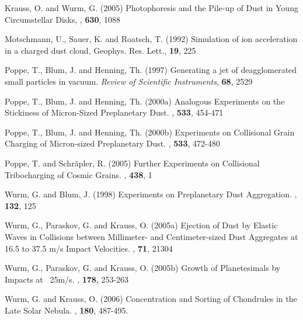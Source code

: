 \begin{ownpubl}
\item Krauss, O. and Wurm, G. (2005) Photophoresis and the Pile-up
of Dust in Young Circumstellar Disks, \apj, \textbf{630}, 1088

\item Motschmann, U., Sauer, K. and Roatsch, T. (1992) Simulation
of ion acceleration in a charged dust cloud, Geophys. Res. Lett.,
\textbf{19}, 225

\item Poppe, T., Blum, J. and Henning, Th. (1997) Generating a jet
of deagglomerated small particles in vacuum. \textit{Review of
Scientific Instruments\/}, \textbf{68}, 2529

\item Poppe, T., Blum, J. and Henning, Th. (2000a) Analogous
Experiments on the Stickiness of Micron-Sized Preplanetary Dust.
\apj, \textbf{533}, 454-471

\item Poppe, T., Blum, J. and Henning, Th. (2000b) Experiments on
Collisional Grain Charging of Micron-sized Preplanetary Dust.
\apj, \textbf{533}, 472-480

\item Poppe, T. and Schr\"apler, R. (2005) Further Experiments on
Collisional Tribocharging of Cosmic Grains. \aap, \textbf{438}, 1

\item Wurm, G. and Blum, J. (1998) Experiments on Preplanetary
Dust Aggregation. \ica, \textbf{132}, 125

\item Wurm, G., Paraskov, G. and Krauss, O. (2005a) Ejection of
Dust by Elastic Waves in Collisions between Millimeter- and
Centimeter-sized Dust Aggregates at 16.5 to 37.5 m/s Impact
Velocities. \phre, \textbf{71}, 21304

\item Wurm, G., Paraskov, G. and Krauss, O. (2005b) Growth of
Planetesimals by Impacts at ~25m/s. \ica, \textbf{178}, 253-263

\item Wurm, G. and Krauss, O. (2006) Concentration and Sorting of
Chondrules in the Late Solar Nebula. \ica, \textbf{180}, 487-495.

\end{ownpubl}
%
